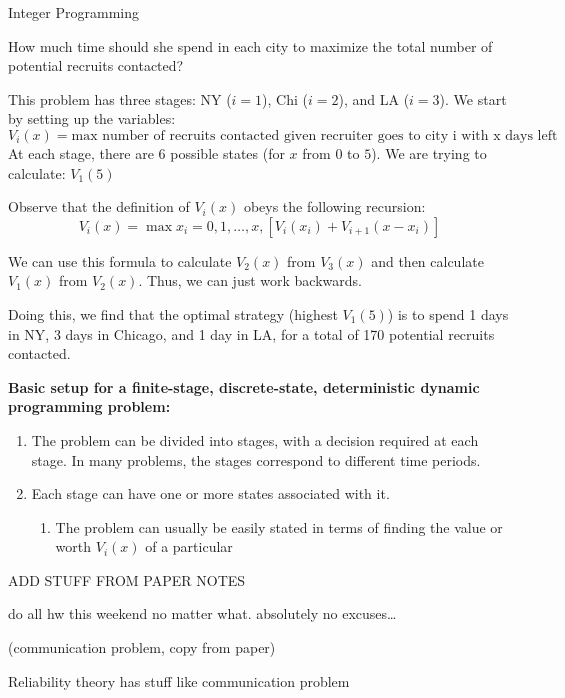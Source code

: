 \documentclass{article}
\begin{document}
\begin{section}{Integer Programming}
\begin{eg}
    How much time should she spend in each city to maximize the total number of potential recruits contacted?
\end{eg}
\begin{answer}
    This problem has three stages: NY (\(i=1\)), Chi (\(i=2\)), and LA (\(i=3\)). We start by setting up the variables: \\
    \[
        V_i(x)=\text{max number of recruits contacted given recruiter goes to city i with x days left}
    \]
    At each stage, there are 6 possible states (for \(x\) from \(0\) to \(5\)). We are trying to calculate: \(V_1(5)\) 

    Observe that the definition of \(V_i(x)\) obeys the following recursion: \\
    \[
        V_i(x)=\max{x_i=0,1,\dots, x, [V_i(x_i)+V_{i+1}(x-x_i)]} %
    \]  

    We can use this formula to calculate \(V_2(x)\) from \(V_3(x)\) and then calculate \(V_1(x)\) from \(V_2(x)\). Thus, 
    we can just work backwards. 

    Doing this, we find that the optimal strategy (highest \(V_1(5)\)) is to spend 1 days in NY, 3 days in Chicago, and 1 day in LA, for a total of 170 potential recruits contacted.
\end{answer}

 \textbf{Basic setup for a finite-stage, discrete-state, deterministic dynamic programming problem:} \\
 \begin{enumerate}
    \item The problem can be divided into stages, with a decision required at each stage. In many problems, 
    the stages correspond to different time periods.
    \item Each stage can have one or more states associated with it. 
    \begin{enumerate}
        \item The problem can usually be easily stated in terms of finding the value or worth \(V_i(x)\) of a particular 
    \end{enumerate}
 \end{enumerate}

 ADD STUFF FROM PAPER NOTES

do all hw this weekend no matter what. absolutely no excuses\dots

(communication problem, copy from paper)

Reliability theory has stuff like communication problem


\end{section}
\end{document}
